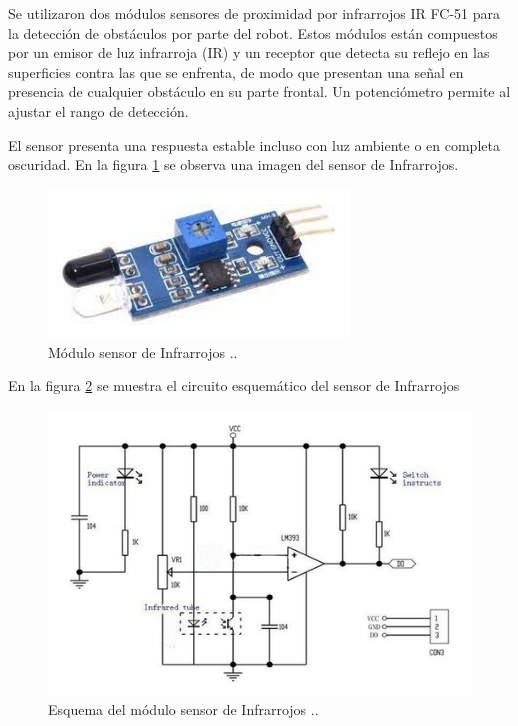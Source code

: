 Se utilizaron dos módulos sensores de proximidad por infrarrojos IR FC-51 \citep{IR} para la detección de obstáculos por parte del robot. Estos módulos están compuestos por  un emisor de luz infrarroja (IR)  y un receptor que detecta su reflejo en  las superficies contra las que se enfrenta, de modo que presentan una señal en  presencia de cualquier obstáculo en su parte frontal. Un potenciómetro permite al ajustar el rango de detección. 

El sensor presenta una respuesta estable incluso con luz ambiente o en completa oscuridad. En la figura \ref{fig:moduloIR} se observa una imagen del sensor de Infrarrojos.

\begin{figure}[h]
	\centering
	\includegraphics[width=8cm]{./Figures/moduloIR.jpg}
	\caption{Módulo sensor de Infrarrojos .\protect\footnotemark.}
	\label{fig:moduloIR}
\end{figure}



En la figura \ref{fig:IRschem} se muestra el circuito esquemático  del sensor de Infrarrojos

\begin{figure}[h]
	\centering
	\includegraphics[width=14cm]{./Figures/IRschem.jpg}
	\caption{Esquema del módulo sensor de Infrarrojos .\protect\footnotemark.}
	\label{fig:IRschem}
\end{figure}
\pagebreak

